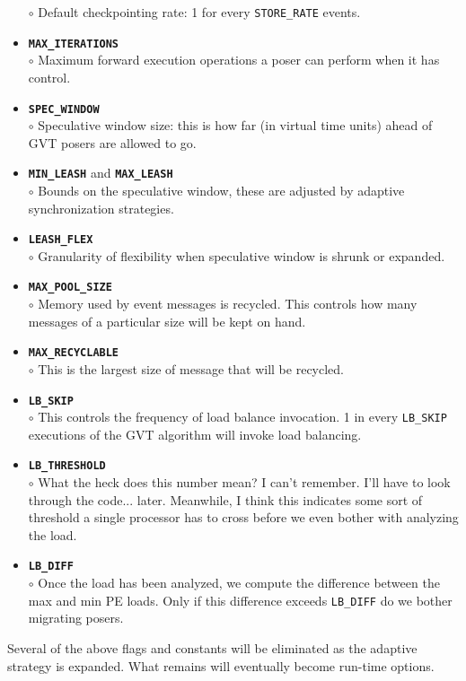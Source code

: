 \begin{itemize}
	$\circ$ Default checkpointing rate: 1 for every {\tt STORE\_RATE} events.\\
\item {\tt {\bf MAX\_ITERATIONS}}\\
	$\circ$ Maximum forward execution operations a poser can perform when it has control.\\
\item {\tt {\bf SPEC\_WINDOW}}\\
	$\circ$ Speculative window size: this is how far (in virtual time units) ahead of GVT posers are allowed to go.\\
\item {\tt {\bf MIN\_LEASH}} and {\tt {\bf MAX\_LEASH}}\\
	$\circ$ Bounds on the speculative window, these are adjusted by adaptive synchronization strategies.\\
\item {\tt {\bf LEASH\_FLEX}}\\
	$\circ$ Granularity of flexibility when speculative window is shrunk or expanded.\\
\item {\tt {\bf MAX\_POOL\_SIZE}}\\
	$\circ$ Memory used by event messages is recycled.  This controls how many messages of a particular size will be kept on hand.
\item {\tt {\bf MAX\_RECYCLABLE}}\\
	$\circ$ This is the largest size of message that will be recycled.
\item {\tt {\bf LB\_SKIP}}\\
	$\circ$ This controls the frequency of load balance invocation.  1 in every {\tt LB\_SKIP} executions of the GVT algorithm will invoke load balancing.
\item {\tt {\bf LB\_THRESHOLD}}\\
	$\circ$ What the heck does this number mean?  I can't remember.  I'll have to look through the code... later.  Meanwhile, I think this indicates some sort of threshold a single processor has to cross before we even bother with analyzing the load.\\
\item {\tt {\bf LB\_DIFF}}\\
	$\circ$ Once the load has been analyzed, we compute the difference between the max and min PE loads.  Only if this difference exceeds {\tt LB\_DIFF} do we bother migrating posers.\\
\end{itemize}

Several of the above flags and constants will be eliminated as the adaptive strategy is expanded.  What remains will eventually become run-time options.

